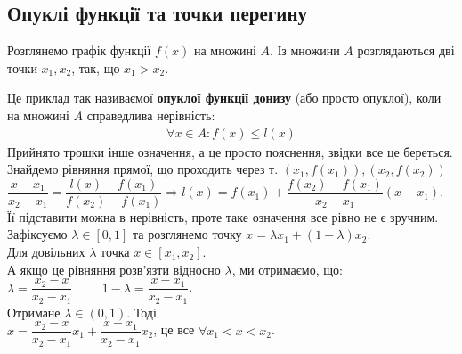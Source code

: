 \documentclass[a4paper, 14pt]{article}
\theoremstyle{theoremdd}
\theoremstyle{theoremdd}
\theoremstyle{theoremdd}
\theoremstyle{theoremdd}
\theoremstyle{theoremdd}
\theoremstyle{theoremdd}
\theoremstyle{theoremdd}
\theoremstyle{theoremdd}
\begin{document}
\subsection{Опуклі функції та точки перегину}
Розглянемо графік функції $f(x)$ на множині $A$. Із множини $A$ розглядаються дві точки $x_1,x_2$, так, що $x_1 > x_2$.
\begin{figure}[H]
\centering
{}
\end{figure}
Це приклад так називаємої \textbf{опуклої функції донизу} (або просто опуклої), коли на множині $A$ справедлива нерівність:
\begin{align*}
\forall x \in A: f(x) \leq l(x)
\end{align*}
Прийнято трошки інше означення, а це просто пояснення, звідки все це береться.\\
Знайдемо рівняння прямої, що проходить через т. $(x_1,f(x_1)), (x_2,f(x_2))$\\
$\dfrac{x-x_1}{x_2-x_1} = \dfrac{l(x)-f(x_1)}{f(x_2)-f(x_1)} \Rightarrow l(x) = f(x_1) + \dfrac{f(x_2)-f(x_1)}{x_2-x_1}(x-x_1)$.\\
Її підставити можна в нерівність, проте таке означення все рівно не є зручним.\\
Зафіксуємо $\lambda \in [0,1]$ та розглянемо точку $x = \lambda x_1 + (1-\lambda) x_2$.\\
Для довільних $\lambda$ точка $x \in [x_1,x_2]$. \\
А якщо це рівняння розв'язти відносно $\lambda$, ми отримаємо, що:\\
$\lambda = \dfrac{x_2-x}{x_2-x_1} \hspace{1cm} 1-\lambda = \dfrac{x-x_1}{x_2-x_1}$.\\
Отримане $\lambda \in (0,1)$. Тоді\\
$x = \dfrac{x_2-x}{x_2-x_1} x_1 + \dfrac{x-x_1}{x_2-x_1} x_2$, це все $\forall x_1 < x < x_2$.\\
\end{document}
